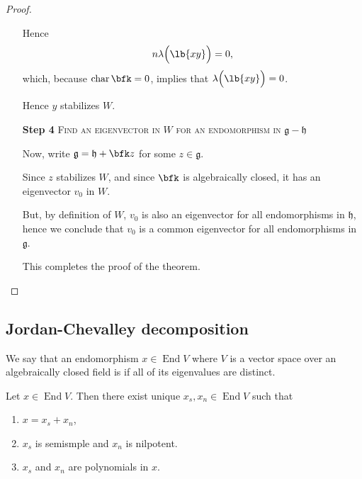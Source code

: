 \documentclass{article}
\DeclarePairedDelimiter\lb\lbrack\rbrack
\DeclareMathOperator{\End}{End}
\DeclareMathOperator{\opchar}{char}
\newcommand*\frkg{{\ensuremath{\mathfrak{g}}}}
\newcommand*\frkh{{\ensuremath{\mathfrak{h}}}}
\begin{document}
\begin{proof}
\begin{itemize}
            Hence
            \[
                n\lambda\Big(\lb{xy}\Big)
                =
                0,
            \]
            which, because $\opchar \bfk = 0$, implies that $\lambda\Big(\lb{xy}\Big) = 0$.

            Hence $y$ stabilizes $W$.
    \item[\textbf{Step 4}]
        \textsc{\color{Crimson} Find an eigenvector in $W$ for an endomorphism in $\frkg - \frkh$}

        Now, write $\frkg = \frkh + \bfk z$ for some $z \in \frkg$.

        Since $z$ stabilizes $W$, and since $\bfk$ is algebraically closed, it has an eigenvector $v_0$ in $W$.

        But, by definition of $W$, $v_0$ is also an eigenvector for all endomorphisms in $\frkh$, hence we conclude that $v_0$ is a common eigenvector for all endomorphisms in $\frkg$.

        This completes the proof of the theorem.
    \end{itemize}

\end{proof}

\subsection{Jordan-Chevalley decomposition}

We say that an endomorphism $x \in \End V$ where $V$ is a vector space over an algebraically closed field is  if all of its eigenvalues are distinct.

\begin{theorem}
    Let $x \in \End V$.
    Then there exist unique $x_s, x_n \in \End V$ such that
    \begin{enumerate}[label=(\alph*)]
        \item 
            $x = x_s + x_n$,
        \item 
            $x_s$ is semismple and $x_n$ is nilpotent.
        \item 
            $x_s$ and $x_n$ are polynomials in $x$.
    \end{enumerate}
\end{theorem}
\end{document}
